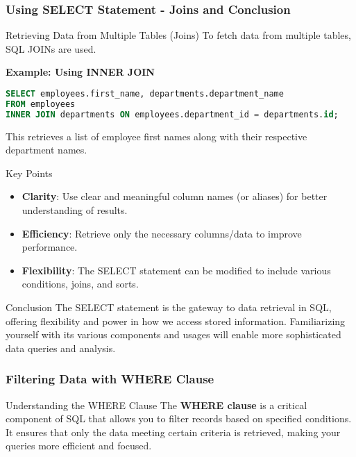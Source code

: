 \documentclass[aspectratio=169]{beamer}
\begin{document}
\begin{frame}[fragile]
    \frametitle{Using SELECT Statement - Joins and Conclusion}
    \begin{block}{Retrieving Data from Multiple Tables (Joins)}
        To fetch data from multiple tables, SQL JOINs are used.
        
        \textbf{Example: Using INNER JOIN}
        \begin{lstlisting}[language=SQL]
SELECT employees.first_name, departments.department_name
FROM employees
INNER JOIN departments ON employees.department_id = departments.id;
        \end{lstlisting}
        This retrieves a list of employee first names along with their 
        respective department names.
    \end{block}

    \begin{block}{Key Points}
        \begin{itemize}
            \item \textbf{Clarity}: Use clear and meaningful column names (or aliases) for better understanding of results.
            \item \textbf{Efficiency}: Retrieve only the necessary columns/data to improve performance.
            \item \textbf{Flexibility}: The SELECT statement can be modified to include various conditions, joins, and sorts.
        \end{itemize}
    \end{block}

    \begin{block}{Conclusion}
        The SELECT statement is the gateway to data retrieval in SQL, offering 
        flexibility and power in how we access stored information. Familiarizing yourself 
        with its various components and usages will enable more sophisticated data 
        queries and analysis.
    \end{block}
\end{frame}

\begin{frame}[fragile]
    \frametitle{Filtering Data with WHERE Clause}
    \begin{block}{Understanding the WHERE Clause}
        The \textbf{WHERE clause} is a critical component of SQL that allows you to filter records based on specified conditions. 
        It ensures that only the data meeting certain criteria is retrieved, making your queries more efficient and focused.
    \end{block}
\end{frame}
\end{document}
